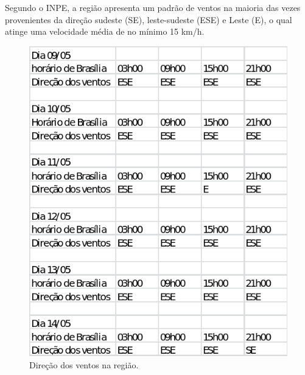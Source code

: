     Segundo o INPE, a região apresenta um padrão de ventos na maioria das vezes provenientes da direção sudeste (SE), leste-sudeste
    (ESE) e Leste (E), o qual atinge uma velocidade média de no mínimo 15 km/h.
    
    \begin{figure}[h]
    \begin{center}
      \includegraphics[scale=0.6]{editaveis/figuras/estudo_ventos}
      \caption[Direção dos ventos na região]{Direção dos ventos na região. \footnotemark}
      \label{estudo_ventos}
    \end{center}
    \end{figure}
    \FloatBarrier
    
